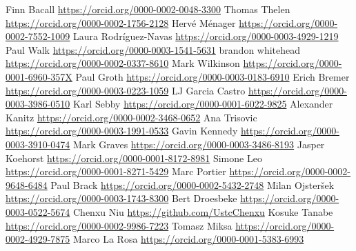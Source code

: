 \markdownRendererUlItem Finn Bacall \url{https://orcid.org/0000-0002-0048-3300}\markdownRendererUlItemEnd 
\markdownRendererUlItem Thomas Thelen \url{https://orcid.org/0000-0002-1756-2128}\markdownRendererUlItemEnd 
\markdownRendererUlItem Hervé Ménager \url{https://orcid.org/0000-0002-7552-1009}\markdownRendererUlItemEnd 
\markdownRendererUlItem Laura Rodríguez-Navas \url{https://orcid.org/0000-0003-4929-1219}\markdownRendererUlItemEnd 
\markdownRendererUlItem Paul Walk \url{https://orcid.org/0000-0003-1541-5631}\markdownRendererUlItemEnd 
\markdownRendererUlItem brandon whitehead \url{https://orcid.org/0000-0002-0337-8610}\markdownRendererUlItemEnd 
\markdownRendererUlItem Mark Wilkinson \url{https://orcid.org/0000-0001-6960-357X}\markdownRendererUlItemEnd 
\markdownRendererUlItem Paul Groth \url{https://orcid.org/0000-0003-0183-6910}\markdownRendererUlItemEnd 
\markdownRendererUlItem Erich Bremer \url{https://orcid.org/0000-0003-0223-1059}\markdownRendererUlItemEnd 
\markdownRendererUlItem LJ Garcia Castro \url{https://orcid.org/0000-0003-3986-0510}\markdownRendererUlItemEnd 
\markdownRendererUlItem Karl Sebby \url{https://orcid.org/0000-0001-6022-9825}\markdownRendererUlItemEnd 
\markdownRendererUlItem Alexander Kanitz \url{https://orcid.org/0000-0002-3468-0652}\markdownRendererUlItemEnd 
\markdownRendererUlItem Ana Trisovic \url{https://orcid.org/0000-0003-1991-0533}\markdownRendererUlItemEnd 
\markdownRendererUlItem Gavin Kennedy \url{https://orcid.org/0000-0003-3910-0474}\markdownRendererUlItemEnd 
\markdownRendererUlItem Mark Graves \url{https://orcid.org/0000-0003-3486-8193}\markdownRendererUlItemEnd 
\markdownRendererUlItem Jasper Koehorst \url{https://orcid.org/0000-0001-8172-8981}\markdownRendererUlItemEnd 
\markdownRendererUlItem Simone Leo \url{https://orcid.org/0000-0001-8271-5429}\markdownRendererUlItemEnd 
\markdownRendererUlItem Marc Portier \url{https://orcid.org/0000-0002-9648-6484}\markdownRendererUlItemEnd 
\markdownRendererUlItem Paul Brack \url{https://orcid.org/0000-0002-5432-2748}\markdownRendererUlItemEnd 
\markdownRendererUlItem Milan Ojsteršek \url{https://orcid.org/0000-0003-1743-8300}\markdownRendererUlItemEnd 
\markdownRendererUlItem Bert Droesbeke \url{https://orcid.org/0000-0003-0522-5674}\markdownRendererUlItemEnd 
\markdownRendererUlItem Chenxu Niu \url{https://github.com/UstcChenxu}\markdownRendererUlItemEnd 
\markdownRendererUlItem Kosuke Tanabe \url{https://orcid.org/0000-0002-9986-7223}\markdownRendererUlItemEnd 
\markdownRendererUlItem Tomasz Miksa \url{https://orcid.org/0000-0002-4929-7875}\markdownRendererUlItemEnd 
\markdownRendererUlItem Marco La Rosa \url{https://orcid.org/0000-0001-5383-6993}\markdownRendererUlItemEnd 
\markdownRendererUlEndTight \relax